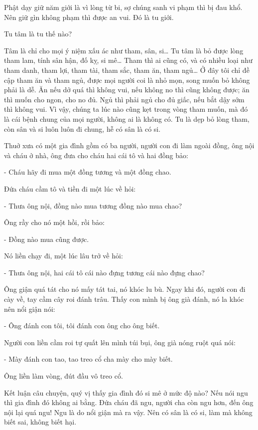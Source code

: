 \documentclass[
  12pt,
  oneside]{book}
\begin{document}
Phật dạy giữ năm giới là vì lòng từ bi, sợ chúng sanh vi phạm thì bị đau khổ. Nên giữ gìn không phạm thì được an vui. Đó là tu giới.

Tu tâm là tu thế nào?

Tâm là chỉ cho mọi ý niệm xấu ác như tham, sân, si\ldots{} Tu tâm là bỏ được lòng tham lam, tính sân hận, đố kỵ, si mê\ldots{} Tham thì ai cũng có, và có nhiều loại như tham danh, tham lợi, tham tài, tham sắc, tham ăn, tham ngủ\ldots{} Ở đây tôi chỉ đề cập tham ăn và tham ngủ, được mọi người coi là nhỏ mọn, song muốn bỏ không phải là dễ. Ăn nếu dở quá thì không vui, nếu không no thì cũng không được; ăn thì muốn cho ngon, cho no đủ. Ngủ thì phải ngủ cho đủ giấc, nếu bắt dậy sớm thì không vui. Vì vậy, chúng ta lúc nào cũng kẹt trong vòng tham muốn, mà đó là cái bệnh chung của mọi người, không ai là không có. Tu là dẹp bỏ lòng tham, còn sân và si luôn luôn đi chung, hễ có sân là có si.

Thuở xưa có một gia đình gồm có ba người, người con đi làm ngoài đồng, ông nội và cháu ở nhà, ông đưa cho cháu hai cái tô và hai đồng bảo:

- Cháu hãy đi mua một đồng tương và một đồng chao.

Đứa cháu cầm tô và tiền đi một lúc về hỏi:

- Thưa ông nội, đồng nào mua tương đồng nào mua chao?

Ông rầy cho nó một hồi, rồi bảo:

- Đồng nào mua cũng được.

Nó liền chạy đi, một lúc lâu trở về hỏi:

- Thưa ông nội, hai cái tô cái nào đựng tương cái nào đựng chao?

Ông giận quá tát cho nó mấy tát tai, nó khóc lu bù. Ngay khi đó, người con đi cày về, tay cầm cây roi đánh trâu. Thấy con mình bị ông già đánh, nó la khóc nên nổi giận nói:

- Ông đánh con tôi, tôi đánh con ông cho ông biết.

Người con liền cầm roi tự quất lên mình túi bụi, ông già nóng ruột quá nói:

- Mày đánh con tao, tao treo cổ cha mày cho mày biết.

Ông liền làm vòng, đút đầu vô treo cổ.

Kết luận câu chuyện, quý vị thấy gia đình đó si mê ở mức độ nào? Nếu nói ngu thì gia đình đó không ai bằng. Đứa cháu đã ngu, người cha còn ngu hơn, đến ông nội lại quá ngu! Ngu là do nổi giận mà ra vậy. Nên có sân là có si, làm mà không biết sai, không biết hại.
\end{document}
